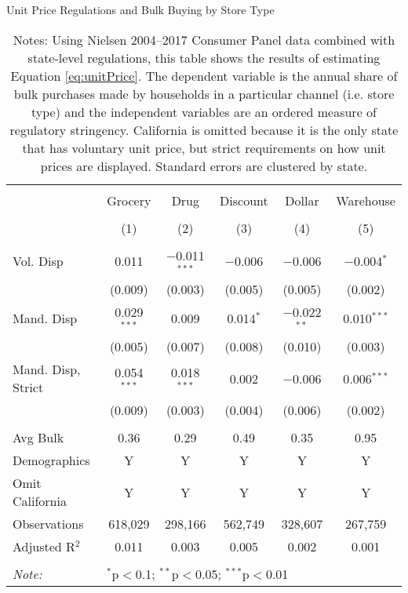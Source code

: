 \begin{table}[!htbp] \centering
  \caption{Unit Price Regulations and Bulk Buying by Store Type}
  \label{tab:unitPriceLawChannel}
\begin{tabular}{@{\extracolsep{5pt}}lccccc}
\\[-1.8ex]\hline
\hline \\[-1.8ex]
 & Grocery & Drug & Discount & Dollar & Warehouse \\
\\[-1.8ex] & (1) & (2) & (3) & (4) & (5)\\
\hline \\[-1.8ex]
 Vol. Disp & 0.011 & $-$0.011$^{***}$ & $-$0.006 & $-$0.006 & $-$0.004$^{*}$ \\
  & (0.009) & (0.003) & (0.005) & (0.005) & (0.002) \\
  Mand. Disp & 0.029$^{***}$ & 0.009 & 0.014$^{*}$ & $-$0.022$^{**}$ & 0.010$^{***}$ \\
  & (0.005) & (0.007) & (0.008) & (0.010) & (0.003) \\
  Mand. Disp, Strict & 0.054$^{***}$ & 0.018$^{***}$ & 0.002 & $-$0.006 & 0.006$^{***}$ \\
  & (0.009) & (0.003) & (0.004) & (0.006) & (0.002) \\
 \hline \\[-1.8ex]
Avg Bulk & 0.36 & 0.29 & 0.49 & 0.35 & 0.95 \\
Demographics & Y & Y & Y & Y & Y \\
Omit California & Y & Y & Y & Y & Y \\
Observations & 618,029 & 298,166 & 562,749 & 328,607 & 267,759 \\
Adjusted R$^{2}$ & 0.011 & 0.003 & 0.005 & 0.002 & 0.001 \\
\hline
\hline \\[-1.8ex]
\textit{Note:}  & \multicolumn{5}{l}{$^{*}$p$<$0.1; $^{**}$p$<$0.05; $^{***}$p$<$0.01} \\
\end{tabular}
\caption*{Notes: Using Nielsen 2004--2017 Consumer Panel data combined with state-level regulations, this table shows the results of estimating Equation \ref{eq:unitPrice}. The dependent variable is the annual share of bulk purchases made by households in a particular channel (i.e. store type) and the independent variables are an ordered measure of regulatory stringency. California is omitted because it is the only state that has voluntary unit price, but strict requirements on how unit prices are displayed. Standard errors are clustered by state.}
\end{table}
